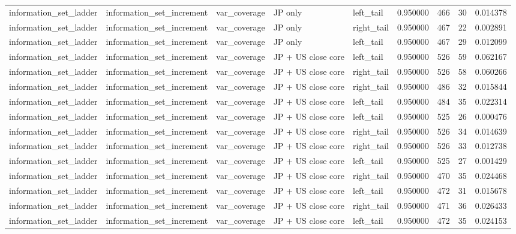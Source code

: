\begin{tabular}{lllllrrrr}
information\_set\_ladder & information\_set\_increment & var\_coverage & JP only & left\_tail & 0.950000 & 466 & 30 & 0.014378 \\
information\_set\_ladder & information\_set\_increment & var\_coverage & JP only & right\_tail & 0.950000 & 467 & 22 & 0.002891 \\
information\_set\_ladder & information\_set\_increment & var\_coverage & JP only & left\_tail & 0.950000 & 467 & 29 & 0.012099 \\
information\_set\_ladder & information\_set\_increment & var\_coverage & JP + US close core & left\_tail & 0.950000 & 526 & 59 & 0.062167 \\
information\_set\_ladder & information\_set\_increment & var\_coverage & JP + US close core & right\_tail & 0.950000 & 526 & 58 & 0.060266 \\
information\_set\_ladder & information\_set\_increment & var\_coverage & JP + US close core & right\_tail & 0.950000 & 486 & 32 & 0.015844 \\
information\_set\_ladder & information\_set\_increment & var\_coverage & JP + US close core & left\_tail & 0.950000 & 484 & 35 & 0.022314 \\
information\_set\_ladder & information\_set\_increment & var\_coverage & JP + US close core & left\_tail & 0.950000 & 525 & 26 & 0.000476 \\
information\_set\_ladder & information\_set\_increment & var\_coverage & JP + US close core & right\_tail & 0.950000 & 526 & 34 & 0.014639 \\
information\_set\_ladder & information\_set\_increment & var\_coverage & JP + US close core & right\_tail & 0.950000 & 526 & 33 & 0.012738 \\
information\_set\_ladder & information\_set\_increment & var\_coverage & JP + US close core & left\_tail & 0.950000 & 525 & 27 & 0.001429 \\
information\_set\_ladder & information\_set\_increment & var\_coverage & JP + US close core & right\_tail & 0.950000 & 470 & 35 & 0.024468 \\
information\_set\_ladder & information\_set\_increment & var\_coverage & JP + US close core & left\_tail & 0.950000 & 472 & 31 & 0.015678 \\
information\_set\_ladder & information\_set\_increment & var\_coverage & JP + US close core & right\_tail & 0.950000 & 471 & 36 & 0.026433 \\
information\_set\_ladder & information\_set\_increment & var\_coverage & JP + US close core & left\_tail & 0.950000 & 472 & 35 & 0.024153 \\

\end{tabular}
